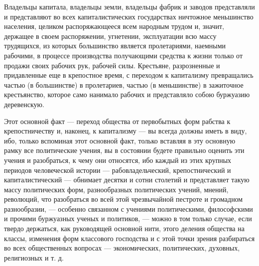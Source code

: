 \documentclass[12pt]{article}
\newcommand{\parnum}{(\arabic{parcount})}
\newcounter{parcount}
\newenvironment{parnumbers}{%
  \par%
  \everypar{\noindent \stepcounter{parcount}\marginpar[]{\parnum}}%
}{}
\begin{document}
\begin{parnumbers}
Владельцы капитала, владельцы земли, владельцы фабрик и заводов представляли и представляют во всех капиталистических государствах ничтожное меньшинство населения, целиком распоряжающееся всем народным трудом и, значит, держащее в своем распоряжении, угнетении, эксплуатации всю массу трудящихся, из которых большинство является пролетариями, наемными рабочими, в процессе производства получающими средства к жизни только от продажи своих рабочих рук, рабочей силы. Крестьяне, разрозненные и придавленные еще в крепостное время, с переходом к капитализму превращались частью (в большинстве) в пролетариев, частью (в меньшинстве) в зажиточное крестьянство, которое само нанимало рабочих и представляло собою буржуазию деревенскую.

Этот основной факт — переход общества от первобытных форм рабства к крепостничеству и, наконец, к капитализму — вы всегда должны иметь в виду, ибо, только вспоминая этот основной факт, только вставляя в эту основную рамку все политические учения, вы в состоянии будете правильно оценить эти учения и разобраться, к чему они относятся, ибо каждый из этих крупных периодов человеческой истории — рабовладельческий, крепостнический и капиталистический — обнимает десятки и сотни столетий и представляет такую массу политических форм, разнообразных политических учений, мнений, революций, что разобраться во всей этой чрезвычайной пестроте и громадном разнообразии, — особенно связанном с учениями политическими, философскими и прочими буржуазных ученых и политиков, — можно в том только случае, если твердо держаться, как руководящей основной нити, этого деления общества на классы, изменения форм классового господства и с этой точки зрения разбираться во всех общественных вопросах — экономических, политических, духовных, религиозных и т. д.


\end{parnumbers}
\end{document}
